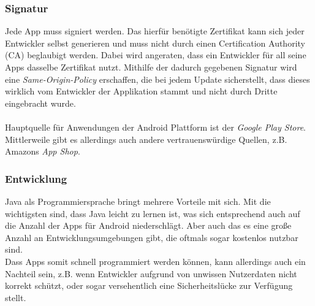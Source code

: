 	\subsubsection{Signatur}
	Jede App muss signiert werden. Das hierfür benötigte Zertifikat kann sich jeder Entwickler selbst generieren und muss nicht durch einen Certification Authority (CA) beglaubigt werden. Dabei wird angeraten, dass ein Entwickler für all seine Apps dasselbe Zertifikat nutzt. Mithilfe der dadurch gegebenen Signatur wird eine \textit{Same-Origin-Policy} erschaffen, die bei jedem Update sicherstellt, dass dieses wirklich vom Entwickler der Applikation stammt und nicht durch Dritte eingebracht wurde.\\\\
	Hauptquelle für Anwendungen der Android Plattform ist der \textit{Google Play Store}. Mittlerweile gibt es allerdings auch andere vertrauenswürdige Quellen, z.B. Amazons \textit{App Shop}.
	
	\subsubsection{Entwicklung}
	Java als Programmiersprache bringt mehrere Vorteile mit sich. Mit die wichtigsten sind, dass Java leicht zu lernen ist, was sich entsprechend auch auf die Anzahl der Apps für Android niederschlägt. Aber auch das es eine große Anzahl an Entwicklungsumgebungen gibt, die oftmals sogar kostenlos nutzbar sind.\\
	Dass Apps somit schnell programmiert werden können, kann allerdings auch ein Nachteil sein, z.B. wenn Entwickler aufgrund von unwissen Nutzerdaten nicht korrekt schützt, oder sogar versehentlich eine Sicherheitslücke zur Verfügung stellt.